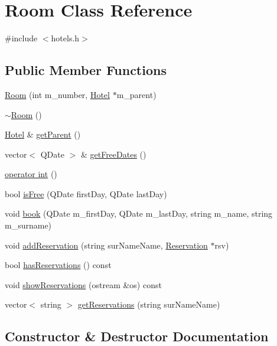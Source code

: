 \hypertarget{class_room}{}\section{Room Class Reference}
\label{class_room}


{\ttfamily \#include $<$hotels.\+h$>$}

\subsection*{Public Member Functions}
\begin{DoxyCompactItemize}
\item 
\hyperlink{class_room_a588e59f9543f9e78cde2b4a812535719}{Room} (int m\+\_\+number, \hyperlink{class_hotel}{Hotel} $\ast$m\+\_\+parent)
\item 
\hyperlink{class_room_a67d5da09983cc53097807fd43ba5481a}{$\sim$\+Room} ()
\item 
\hyperlink{class_hotel}{Hotel} \& \hyperlink{class_room_aa1b182693c0bae407f74fcb2815d1605}{get\+Parent} ()
\item 
vector$<$ Q\+Date $>$ \& \hyperlink{class_room_a92a34c55f5109a669b164653d391a5eb}{get\+Free\+Dates} ()
\item 
\hyperlink{class_room_a41563a17c78b8dcebaaae4d07dd3537c}{operator int} ()
\item 
bool \hyperlink{class_room_a72182e2599a2aac3312ef8aa040803af}{is\+Free} (Q\+Date first\+Day, Q\+Date last\+Day)
\item 
void \hyperlink{class_room_a01b6361bb54fe5f61cf7c768e60bf6fc}{book} (Q\+Date m\+\_\+first\+Day, Q\+Date m\+\_\+last\+Day, string m\+\_\+name, string m\+\_\+surname)
\item 
void \hyperlink{class_room_aa606091a9d9aad6801675384c77d6634}{add\+Reservation} (string sur\+Name\+Name, \hyperlink{class_reservation}{Reservation} $\ast$rsv)
\item 
bool \hyperlink{class_room_ad05581dd91f323159ee69d52197ed595}{has\+Reservations} () const
\item 
void \hyperlink{class_room_af606f87948de7df87296b3c720500cb7}{show\+Reservations} (ostream \&os) const
\item 
vector$<$ string $>$ \hyperlink{class_room_a10d6dafe0c9e42cfaa19c049e0263d99}{get\+Reservations} (string sur\+Name\+Name)
\end{DoxyCompactItemize}


\subsection{Constructor \& Destructor Documentation}
\mbox{\label{class_room_a588e59f9543f9e78cde2b4a812535719}} 
